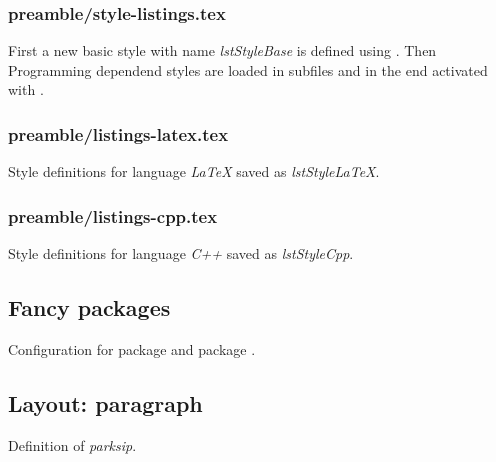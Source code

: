 \subsubsection{preamble/style-listings.tex}

First a new basic style with name \emph{lstStyleBase} is defined using . Then Programming dependend styles are loaded in subfiles and in the end activated with .


\subsubsection{preamble/listings-latex.tex}

Style definitions for language \emph{LaTeX} saved as \emph{lstStyleLaTeX}.


\subsubsection{preamble/listings-cpp.tex}

Style definitions for language \emph{C++} saved as \emph{lstStyleCpp}.



\subsection{Fancy packages}

Configuration for package  and package .


\subsection{Layout: paragraph}

Definition of \emph{parksip}.

